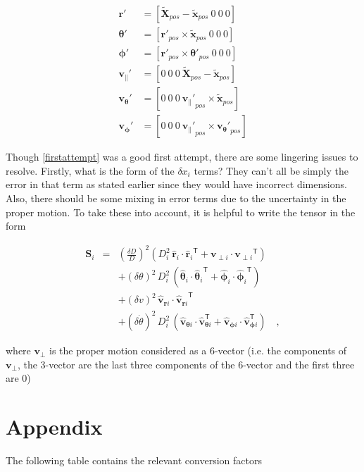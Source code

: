 \documentclass[12pt,preprint]{aastex}
\newcommand{\mtensor}[1]{\boldsymbol{#1}}
\newcommand{\mS}{\mtensor{S}}
\newcommand{\mvector}[1]{\mtensor{#1}}
\renewcommand{\vr}{\mvector{r}}
\newcommand{\vv}{\mvector{v}}
\newcommand{\vx}{\mvector{x}}
\newcommand{\vX}{\mvector{X}}
\newcommand{\vtheta}{\mvector{\theta}}
\newcommand{\vphi}{\mvector{\phi}}
\newcommand{\transpose}[1]{{#1}^{\textsf{T}}}
\newcommand{\rhat}{\hat{\vr}}
\newcommand{\thetahat}{\hat{\vtheta}}
\newcommand{\phihat}{\hat{\vphi}}
\newcommand{\vhat}{\hat{\vv}}
\begin{document}
\begin{subequations}
\begin{align}
\mtensor{r'} &= [ \tilde{\vX}_{pos}- \tilde{\vx}_{pos} \ 0 \ 0 \ 0]\\
\mtensor{\theta'} &= [\mtensor{r'}_{pos}\times\tilde{\vx}_{pos}  \ 0 \ 0 \ 0] \\
\mtensor{\phi'} &=  [\mtensor{r'}_{pos}\times\mtensor{\theta'}_{pos} \ 0 \ 0 \ 0]  \\
\mtensor{v_{\parallel}'} &= [0 \ 0 \ 0 \ \tilde{\vX}_{pos}- \tilde{\vx}_{pos}]\\
\mtensor{v_\theta'} &= [0 \ 0 \ 0 \ \mtensor{v_{\parallel}'}_{pos}\times\tilde{\vx}_{pos}] \\
\mtensor{v_\phi'} &=  [0 \ 0 \ 0 \ \mtensor{v_{\parallel}'}_{pos}\times\mtensor{v_\theta'}_{pos}] 
\end{align}
\end{subequations} 

Though \eqref{firstattempt} was a good first attempt, there are some lingering issues to resolve. Firstly, what is the form of the $\delta x_i$ terms? They can't all be simply the error in that term as stated earlier since they would have incorrect dimensions. Also, there should be some mixing in error terms due to the uncertainty in the proper motion.  To take these into account, it is helpful to write the tensor in the form

\begin{eqnarray}\displaystyle
\mS_i &=&
  \left(\frac{\delta D}{D}\right)^2
    (D_i^2\,\rhat_i\cdot\transpose{\rhat_i} +
      \vv_{\perp i}\cdot\transpose{\vv_{\perp i}})
\nonumber\\
&&+ (\delta\theta)^2\,D_i^2\,
    (\thetahat_i\cdot\transpose{\thetahat_i}
   + \phihat_i\cdot\transpose{\phihat_i})
\nonumber\\
&&+ (\delta v)^2\,\vhat_{\vr i}\cdot\transpose{\vhat_{\vr i}}
\nonumber\\
&&+ (\delta\dot{\theta})^2\,D_i^2\,
    (\vhat_{\vtheta i}\cdot\transpose\vhat_{\vtheta i}
   + \vhat_{\vphi i}\cdot\transpose\vhat_{\vphi i})
\quad ,
\end{eqnarray}

where $\vv_{\perp}$ is the proper motion considered as a 6-vector (i.e. the components of $\vv_{\perp}$, the 3-vector are the last three components of the 6-vector and the first three are 0)



\section{Appendix}
The following table contains the relevant conversion factors
\end{document}
